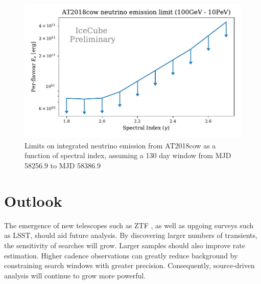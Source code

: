 \documentclass{PoS}
\begin{document}
\begin{figure}[!ht]
	\centering \includegraphics[width=\textwidth]{figures/AT2018cow_limit_plot.pdf}
	\caption{Limits on integrated neutrino emission from AT2018cow as a function of spectral index, assuming a 130 day window from MJD 58256.9 to MJD 58386.9}
	\label{fig:At2018cow}
\end{figure}

\section{Outlook}

The emergence of new telescopes such as ZTF \cite{2019PASP..131a8002B}, as well as upgoing surveys such as LSST, should aid future analysis. By discovering larger numbers of transients, the sensitivity of searches will grow. Larger samples should also improve rate estimation. Higher cadence observations can greatly reduce background by constraining search windows with greater precision. Consequently, source-driven analysis will continue to grow more powerful.



\end{document}
